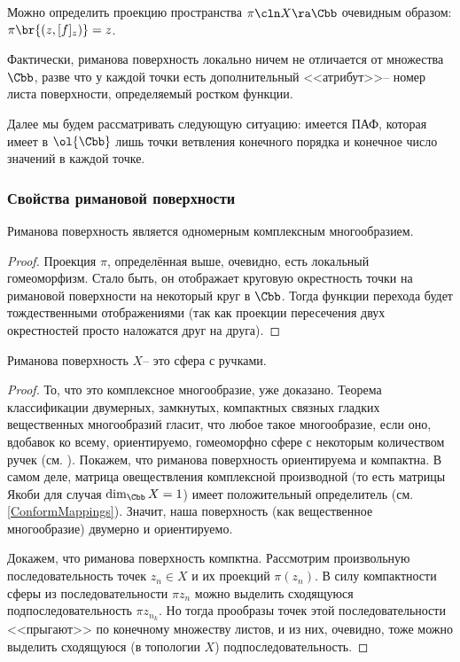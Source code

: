 \documentclass[a4paper]{article}
\begin{document}
Можно определить проекцию пространства $\pi\cln X \ra \Cbb$ очевидным образом: $\pi\br{(z,[f]_z)} = z$.

Фактически, риманова поверхность локально ничем не отличается от множества $\Cbb$, разве что у каждой точки
есть дополнительный <<атрибут>>-- номер листа поверхности, определяемый ростком функции.


Далее мы будем рассматривать следующую ситуацию: имеется ПАФ, которая имеет в $\ol{\Cbb}$ лишь точки
ветвления конечного порядка и конечное число значений в каждой точке.

\subsubsection{Свойства римановой поверхности}

\begin{theorem}
Риманова поверхность является одномерным комплексным многообразием.
\end{theorem}
\begin{proof}
Проекция $\pi$, определённая выше, очевидно, есть локальный гомеоморфизм. Стало быть, он отображает
круговую окрестность точки на римановой поверхности на некоторый круг в $\Cbb$. Тогда функции перехода
будет тождественными отображениями (так как проекции пересечения двух окрестностей просто наложатся друг на друга).
\end{proof}

\begin{imp}
Риманова поверхность $X$-- это сфера с ручками.
\end{imp}
\begin{proof}
То, что это комплексное многообразие, уже доказано. Теорема классификации двумерных, замкнутых, компактных
связных гладких вещественных многообразий гласит, что любое такое многообразие, если оно, вдобавок ко всему,
ориентируемо, гомеоморфно сфере с некоторым количеством ручек (см. \cite[гл.~4, \S~5, п.~3]{fomenko}). Покажем, что
риманова поверхность ориентируема и компактна. В самом деле, матрица овеществления комплексной производной (то
есть матрицы Якоби для случая $\dim_\Cbb X = 1$) имеет положительный определитель (см. \ref{ConformMappings}).
Значит, наша поверхность (как вещественное многообразие) двумерно и ориентируемо.

Докажем, что риманова поверхность компктна. Рассмотрим произвольную последовательность точек $z_n \in X$ и
их проекций $\pi(z_n)$. В силу компактности сферы из последовательности $\pi{z_n}$ можно выделить
сходящуюся подпоследовательность $\pi{z_{n_k}}$. Но тогда прообразы точек этой последовательности <<прыгают>> по
конечному множеству листов, и из них, очевидно, тоже можно выделить сходящуюся (в топологии $X$) подпоследовательность.
\end{proof}
\end{document}
